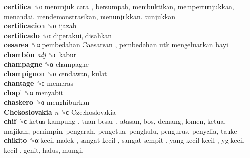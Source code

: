 \textbf{certifica} ␝α   menunjuk cara , bersumpah, membuktikan, mempertunjukkan, menandai, mendemonstrasikan, menunjukkan, tunjukkan  \\
\textbf{certificacion} ␝α  ijazah  \\
\textbf{certificado} ␝α  diperakui, disahkan  \\
\textbf{cesarea} ␝α   pembedahan Caesarean ,  pembedahan utk mengeluarkan bayi   \\
\textbf{chambòn} \emph{adj}  ␝ϲ  kabur  \\
\textbf{champagne} ␝α  champagne  \\
\textbf{champignon} ␝α  cendawan, kulat  \\
\textbf{chantage} ␝ϲ  memeras  \\
\textbf{chapi} ␝α  menyabit  \\
\textbf{chaskero} ␝α  menghiburkan  \\
\textbf{Chekoslovakia} \emph{n}  ␝ϲ   Czechoslovakia   \\
\textbf{chif} ␝ϲ   ketua kampung ,  tuan besar , atasan, bos, demang, fomen, ketua, majikan, pemimpin, pengarah, pengetua, penghulu, pengurus, penyelia, tauke  \\
\textbf{chikito} ␝α   kecil molek ,  sangat kecil ,  sangat sempit ,  yang kecil-kecil ,  yg kecil-kecil , genit, halus, mungil  \\
